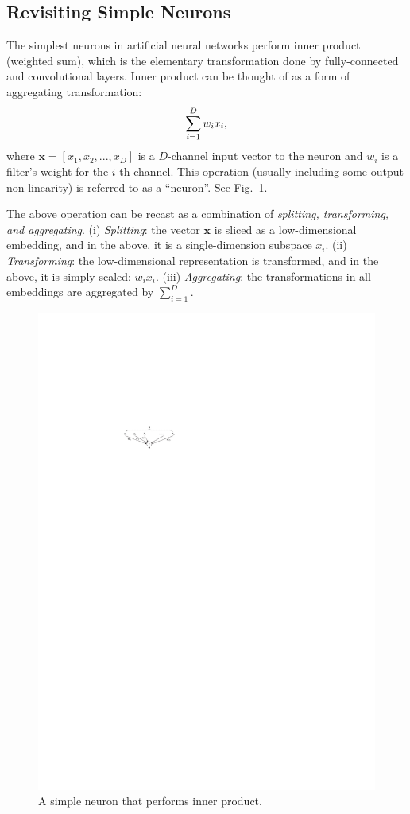 \documentclass[10pt,twocolumn,letterpaper]{article}
\newcommand{\ve}[1]{\mathbf{#1}} %
\begin{document}
\subsection{Revisiting Simple Neurons}

The simplest neurons in artificial neural networks perform inner product (weighted sum), which is the elementary transformation done by fully-connected and convolutional layers. 
Inner product can be thought of as a form of aggregating transformation:
\vspace{-.5em}
\begin{equation}\label{eq:inner}
\sum_{i=1}^{D}w_i x_i,
\vspace{-.5em}
\end{equation}
where $\ve{x}=[x_1, x_2, ..., x_{D}]$ is a $D$-channel input vector to the neuron and $w_i$ is a filter's weight for the $i$-th channel.
This operation (usually including some output non-linearity) is referred to as a ``neuron''. See Fig.~\ref{fig:neuron}.

The above operation can be recast as a combination of \emph{splitting, transforming, and aggregating}. (i) \emph{Splitting}: the vector $\ve{x}$ is sliced as a low-dimensional embedding, and in the above, it is a single-dimension subspace $x_i$. (ii) \emph{Transforming}: the low-dimensional representation is transformed, and in the above, it is simply scaled: $w_i x_i$.
(iii) \emph{Aggregating}: the transformations in all embeddings are aggregated by $\sum_{i=1}^{D}$.

\begin{figure}[t]
\centering
\vspace{-1em}
\includegraphics[width=0.7\linewidth]{figures/blocks/neuron}
\caption{A simple neuron that performs inner product.}
\label{fig:neuron}
\end{figure}
\end{document}
